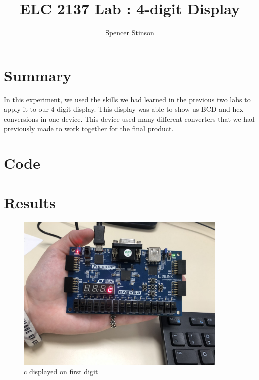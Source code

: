 \documentclass[11pt]{article}
\newcommand{\Verilog}[2][]{%
	
}
\begin{document}
\title{ELC 2137 Lab : 4-digit Display}
\author{Spencer Stinson}

\maketitle


\section*{Summary}

In this experiment, we used the skills we had learned in the previous two labs to apply it to our 4 digit display. This display was able to show us BCD and hex conversions in one device. This device used many different converters that we had previously made to work together for the final product. 

\section*{Code}

\Verilog[caption= mux2 code]{C:/Users/spencer_stinson1/Documents/GitHub/Lab08/Lab_08/Lab_08.srcs/sources_1/new/mux2.sv}
\Verilog[caption= mux4 code]{C:/Users/spencer_stinson1/Documents/GitHub/Lab08/Lab_08/Lab_08.srcs/sources_1/new/mux4.sv}
\Verilog[caption= an decoder code]{C:/Users/spencer_stinson1/Documents/GitHub/Lab08/Lab_08/Lab_08.srcs/sources_1/new/an_decoder.sv}
\Verilog[caption= sseg4 code]{C:/Users/spencer_stinson1/Documents/GitHub/Lab08/Lab_08/Lab_08.srcs/sources_1/new/sseg4.sv}
\Verilog[caption= sseg4 manual code]{C:/Users/spencer_stinson1/Documents/GitHub/Lab08/Lab_08/Lab_08.srcs/sources_1/new/sseg4_manual.sv}


\section*{Results}
\begin{figure}[ht]\centering 
\includegraphics[width= 0.9\textwidth]{b1.png}
\caption{c displayed on first digit}
\label{fig: pic1}
\end{figure}
\end{document}
